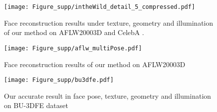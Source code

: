 \documentclass[runningheads]{llncs}
\begin{document}
\begin{figure}[htbp]
	\centering
	\texttt{[image: Figure\_supp/intheWild\_detail\_5\_compressed.pdf]}
	\caption{Face reconstruction results under texture, geometry and illumination of our method on AFLW20003D \cite{dataset_aflw20003D_300WLP_zhu2016face} and CelebA \cite{dataset_liu2015deep_celeba}. }
	\label{fig:aflwcelebA_fml}
\end{figure}


\begin{figure}[htbp]
	\centering
	\texttt{[image: Figure\_supp/aflw\_multiPose.pdf]}
	\caption{Face reconstruction results of our method on AFLW20003D \cite{dataset_aflw20003D_300WLP_zhu2016face} }
	\label{fig:aflw}
\end{figure}


\begin{figure*}[htbp]
	\centering
	\texttt{[image: Figure\_supp/bu3dfe.pdf]}
	\caption{Our accurate result in face pose, texture, geometry and illumination on BU-3DFE dataset \cite{dataset_bu3dfe_yin20063d,dataset_bu4dfe_yin20063d}}
	\label{fig:bu3dfe}
\end{figure*}
\end{document}
